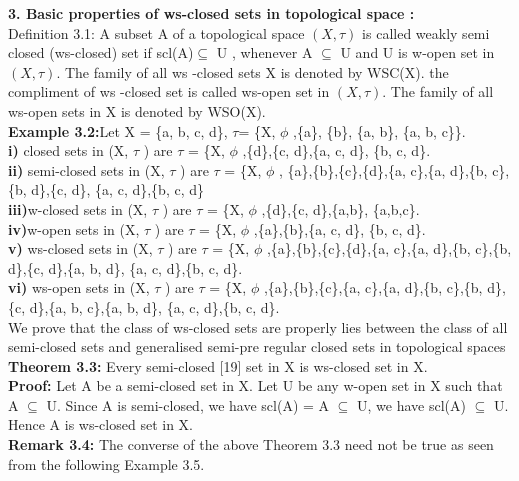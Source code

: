 	\textbf{3.  Basic properties of ws-closed sets in topological space :  }
	\\Definition 3.1: A subset A of a topological space $(X,\tau)$ is called weakly semi closed (ws-closed) set if scl(A)$\subseteq$ U , whenever A $\subseteq$  U and   U is w-open set in $(X,\tau)$. The family of all ws -closed sets X is denoted by WSC(X). the compliment of ws -closed set is called ws-open set in $(X,\tau)$.  The family  of all ws-open  sets in X is denoted by WSO(X).
	\\\textbf{Example 3.2:}Let X = \{a, b, c, d\},   $\tau$= \{X, $\phi$ ,\{a\}, \{b\}, \{a, b\}, \{a, b, c\}\}.
	\\\textbf{i)}	closed sets in (X, $\tau$ ) are $\tau$ = \{X, $\phi$ ,\{d\},\{c, d\},\{a, c, d\}, \{b, c, d\}.
	\\\textbf{ii)}	semi-closed sets in (X, $\tau$ ) are $\tau$ = \{X, $\phi$ , \{a\},\{b\},\{c\},\{d\},\{a, c\},\{a, d\},\{b, c\},\{b, d\},\{c, d\}, \{a, c, d\},\{b, c, d\}
	\\\textbf{iii)}w-closed sets in (X, $\tau$ ) are $\tau$ = \{X, $\phi$ ,\{d\},\{c, d\},\{a,b\}, \{a,b,c\}.
	\\\textbf{iv)}w-open sets in (X, $\tau$ ) are $\tau$ = \{X, $\phi$ ,\{a\},\{b\},\{a, c, d\}, \{b, c, d\}.
	\\\textbf{v)} ws-closed sets in (X, $\tau$ ) are $\tau$ = \{X, $\phi$ ,\{a\},\{b\},\{c\},\{d\},\{a, c\},\{a, d\},\{b, c\},\{b, d\},\{c, d\},\{a, b, d\}, \{a, c, d\},\{b, c, d\}.
	\\\textbf{vi)} ws-open sets in (X, $\tau$ ) are $\tau$ = \{X, $\phi$ ,\{a\},\{b\},\{c\},\{a, c\},\{a, d\},\{b, c\},\{b, d\},\{c, d\},\{a, b, c\},\{a, b, d\}, \{a, c, d\},\{b, c, d\}.
	\\\indent We prove that the class of ws-closed sets are properly lies between the class of all semi-closed sets and generalised semi-pre regular closed sets in topological spaces
	\\\textbf{Theorem 3.3:} Every semi-closed [19] set in X is ws-closed set in X.
	\\\textbf{Proof:} Let A be a semi-closed set in X. Let U be any w-open set in X  such that  A $\subseteq$ U. Since A is semi-closed, we have scl(A) = A $\subseteq$ U, we have  scl(A) $\subseteq$ U.   Hence A is ws-closed set in X.
	\\\textbf{Remark 3.4:} The converse of the above Theorem 3.3 need not be true as seen from the following Example 3.5.
